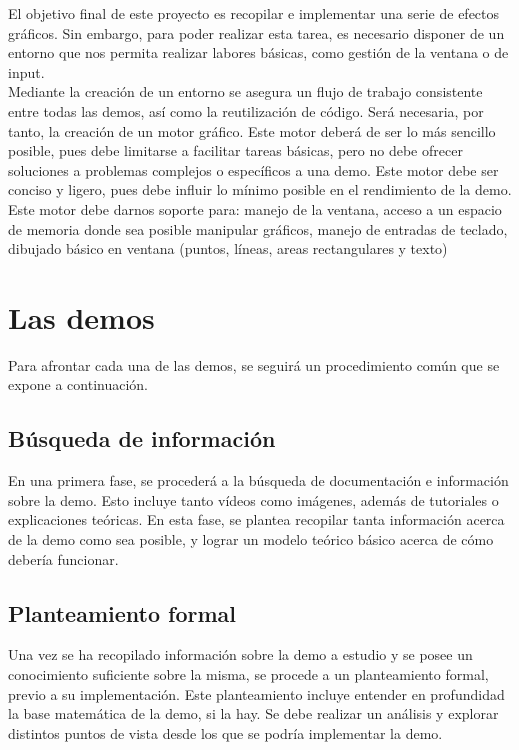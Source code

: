 El objetivo final de este proyecto es recopilar e implementar una serie de efectos gráficos. Sin embargo, para poder realizar esta tarea, es necesario disponer de un entorno que nos permita realizar labores básicas, como gestión de la ventana o de input.\\

Mediante la creación de un entorno se asegura un flujo de trabajo consistente entre todas las demos, así como la reutilización de código. Será necesaria, por tanto, la creación de un motor gráfico. Este motor deberá de ser lo más sencillo posible, pues debe limitarse a facilitar tareas básicas, pero no debe ofrecer soluciones a problemas complejos o específicos a una demo. Este motor debe ser conciso y ligero, pues debe influir lo mínimo posible en el rendimiento de la demo.\\

Este motor debe darnos soporte para: manejo de la ventana, acceso a un espacio de memoria donde sea posible manipular gráficos, manejo de entradas de teclado, dibujado básico en ventana (puntos, líneas, areas rectangulares y texto)

\section{Las demos}

Para afrontar cada una de las demos, se seguirá un procedimiento común que se expone a continuación.

\subsection{Búsqueda de información}

En una primera fase, se procederá a la búsqueda de documentación e información sobre la demo. Esto incluye tanto vídeos como imágenes, además de tutoriales o explicaciones teóricas. En esta fase, se plantea recopilar tanta información acerca de la demo como sea posible, y lograr un modelo teórico básico acerca de cómo debería funcionar.

\subsection{Planteamiento formal}

Una vez se ha recopilado información sobre la demo a estudio y se posee un conocimiento suficiente sobre la misma, se procede a un planteamiento formal, previo a su implementación. Este planteamiento incluye entender en profundidad la base matemática de la demo, si la hay. Se debe realizar un análisis y explorar distintos puntos de vista desde los que se podría implementar la demo.

